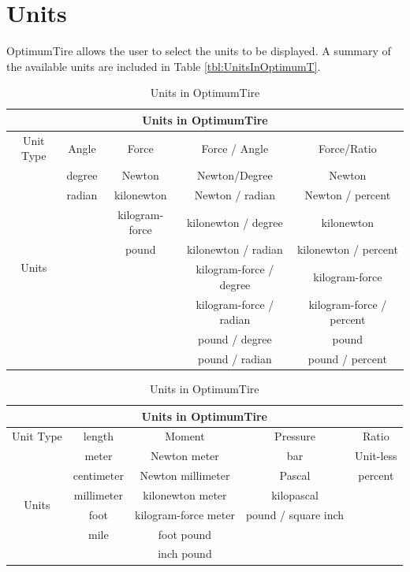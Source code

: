 \section{Units}
\label{sec:Units}
OptimumTire allows the user to select the units to be displayed. A summary of the available units are included in Table \ref{tbl:UnitsInOptimumT}.

\begin{table}[H]
	\centering
			\begin{tabular}{|c|c|c|c|c|}
			\hline
			\multicolumn{5}{|c|}{\cellcolor{tblue}\textbf{Units in OptimumTire}} \\ \hline
			\rowcolor{ttblue}Unit Type	& Angle	&Force	&Force / Angle & Force/Ratio	\\ \hline
			\multirow{8}{*}{Units}&	degree&	Newton & Newton/Degree&Newton	\\ \cline{2-5}
			&radian	&kilonewton	&Newton / radian&Newton / percent	 \\ \cline{2-5}
			& &	kilogram-force&	kilonewton / degree&	kilonewton \\ \cline{2-5}
			& & pound	&kilonewton / radian	&kilonewton / percent\\ \cline{2-5}
			& & & kilogram-force / degree  &	kilogram-force \\ \cline{2-5}
			& & & kilogram-force / radian  &	kilogram-force / percent \\ \cline{2-5}
			& & & pound / degree  &	pound \\ \cline{2-5}
			& & & pound / radian  &pound / percent \\ \hline
			
		\end{tabular}
		\caption{Units in OptimumTire}
		
\end{table}

\begin{table}[h]
	\centering
			\begin{tabular}{|c|c|c|c|c|}
			\hline
			\multicolumn{5}{|c|}{\cellcolor{tblue}\textbf{Units in OptimumTire}} \\ \hline
			\rowcolor{ttblue}Unit Type	& length & Moment	& Pressure	& Ratio	\\ \hline
			\multirow{6}{*}{Units} & meter & Newton meter	& bar &	Unit-less	\\ \cline{2-5}
			& centimeter & Newton millimeter &	Pascal & percent\\ \cline{2-5}
			& millimeter & kilonewton meter	& kilopascal	& \\ \cline{2-5}
			&	foot & kilogram-force meter	& pound / square inch & \\ \cline{2-5}
			&	mile & foot pound & & \\ \cline{2-5}
			& & inch pound & & \\ \hline
			
		\end{tabular}
		\caption{Units in OptimumTire}
		
\end{table}

